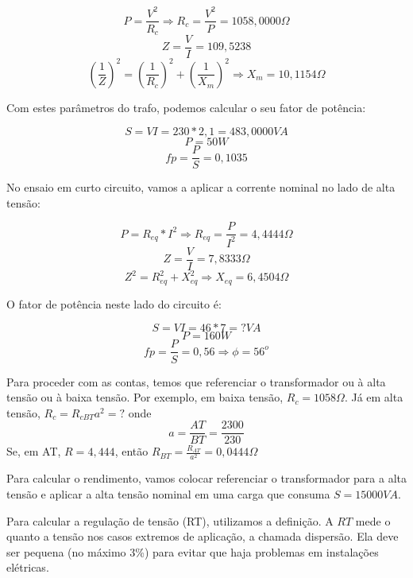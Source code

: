 \documentclass[12pt, a4paper, twoside]{article}
\begin{document}
$$ P = \frac{V^2}{R_c} \Rightarrow R_c = \frac{V^2}{P} = 1058,0000 \Omega $$
$$ Z = \frac{V}{I} = 109,5238 $$
$$ (\frac{1}{Z})^2 = (\frac{1}{R_c})^2 + (\frac{1}{X_m})^2 \Rightarrow X_m = 10,1154 \Omega $$

Com estes parâmetros do trafo, podemos calcular o seu fator de potência:

$$ S = VI = 230 * 2,1 = 483,0000 VA $$
$$ P = 50W $$
$$ fp = \frac{P}{S} = 0,1035 $$

No ensaio em curto circuito, vamos a aplicar a corrente nominal no lado de alta tensão:

$$ P = R_{eq} * I^2 \Rightarrow R_{eq} = \frac{P}{I^2} = 4,4444 \Omega $$
$$ Z = \frac{V}{I} = 7,8333 \Omega $$
$$ Z^2 = R_{eq}^2 + X_{eq}^2 \Rightarrow X_{eq} = 6,4504 \Omega $$

O fator de potência neste lado do circuito é:

$$ S = VI = 46 * 7 = ? VA $$
$$ P = 160W$$
$$ fp = \frac{P}{S} = 0,56 \Rightarrow \phi = 56^o $$

Para proceder com as contas, temos que referenciar o transformador ou à alta tensão ou à baixa tensão. Por exemplo, em baixa tensão, $R_c = 1058 \Omega$. Já em alta tensão, $R_c = R_{c BT} a^2 = ? $ onde
$$ a = \frac{AT}{BT} = \frac{2300}{230} $$
Se, em AT, $ R = 4,444 $, então $R_{BT} = \frac{R_{AT}}{a^2} = 0,0444 \Omega $

Para calcular o rendimento, vamos colocar referenciar o transformador para a alta tensão e aplicar a alta tensão nominal em uma carga que consuma $ S = 15000VA $.

Para calcular a regulação de tensão (RT), utilizamos a definição. A $RT$ mede o quanto a tensão nos casos extremos de aplicação, a chamada dispersão. Ela deve ser pequena (no máximo 3\%) para evitar que haja problemas em instalações elétricas.
\end{document}
